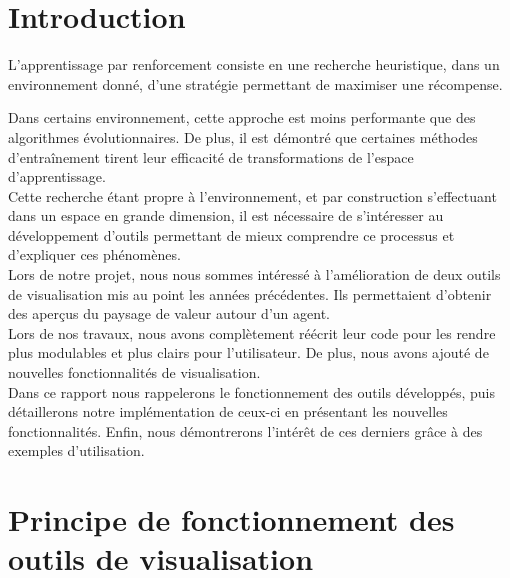 \documentclass[12pt]{article}
\begin{document}
\newpage																		
\renewcommand*\contentsname{Table des Matières}
\tableofcontents 

\newpage
\setlength{\parindent}{2ex}

\section*{Introduction}

L’apprentissage par renforcement consiste en une recherche heuristique, dans un environnement donné, d’une stratégie permettant de maximiser une récompense. \par

Dans certains environnement, cette approche est moins performante que des algorithmes évolutionnaires. De plus, il est démontré que certaines méthodes d’entraînement tirent leur efficacité de transformations de l’espace d’apprentissage. \\

Cette recherche étant propre à l’environnement, et par construction s’effectuant dans un espace en grande dimension, il est nécessaire de s’intéresser au développement d’outils permettant de mieux comprendre ce processus et d’expliquer ces phénomènes. \\

Lors de notre projet, nous nous sommes intéressé à l’amélioration de deux outils de visualisation mis au point les années précédentes. Ils permettaient d’obtenir des aperçus du paysage de valeur autour d’un agent. \\

Lors de nos travaux, nous avons complètement réécrit leur code pour les rendre plus modulables et plus clairs pour l’utilisateur. De plus, nous avons ajouté de nouvelles fonctionnalités de visualisation. \\

Dans ce rapport nous rappelerons le fonctionnement des outils développés, puis détaillerons notre implémentation de ceux-ci en présentant les nouvelles fonctionnalités. Enfin, nous démontrerons l'intérêt de ces derniers grâce à des exemples d'utilisation. \\

\newpage
\section{Principe de fonctionnement des outils de visualisation}
\end{document}
